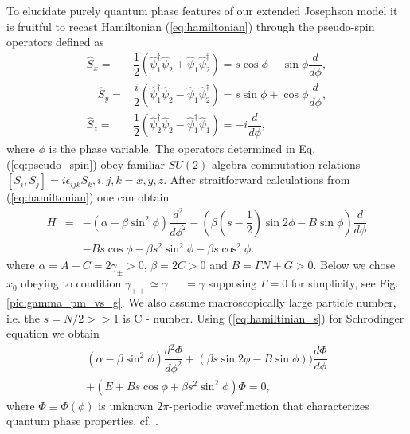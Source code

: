 \documentclass[aps, pre, preprint, groupedaddress, superscriptaddress, showkeys, showpacs] {revtex4-1}
\begin{document}
To elucidate purely quantum phase features of our extended Josephson model it is fruitful to recast Hamiltonian (\ref{eq:hamiltonian}) through the pseudo-spin operators defined as
% 
\begin{subequations}
\begin{align}
\hat{S}_x = & \dfrac{1}{2} (\hat{\psi}_1^\dag \hat{\psi}_2 + \hat{\psi}_1 \hat{\psi}_2^\dag) = s \cos{\phi} - \sin{\phi} \dfrac{d}{d \phi}, \\
\quad \hat{S}_y = & \dfrac{i}{2} (\hat{\psi}_1^\dag \hat{\psi}_2 - \hat{\psi}_1 \hat{\psi}_2^\dag) = s \sin{\phi} + \cos{\phi} \dfrac{d}{d \phi}, \\
\hat{S}_z = & \dfrac{1}{2} (\hat{\psi}_2^\dag \hat{\psi}_2 - \hat{\psi}_1^\dag \hat{\psi}_1) = -i\dfrac{d}{d \phi},
\end{align}
\label{eq:pseudo_spin}
\end{subequations}
where  $\phi$ is the phase variable.
The operators determined in Eq. (\ref{eq:pseudo_spin}) obey familiar $SU(2)$ algebra commutation relations $[S_i, S_j] = i\epsilon_{ijk}S_k,  i,j,k=x,y,z$.
After straitforward calculations from (\ref{eq:hamiltonian}) one can obtain
%
\begin{equation}
\begin{array}{lcl}
H & = & -(\alpha - \beta \sin^2 \phi) \dfrac{d^2}{d \phi^2} - (\beta(s-\dfrac{1}{2})\sin{2\phi} - B\sin{\phi}) \dfrac{d}{d \phi} \\
&& - Bs \cos \phi - \beta s^2 \sin^2 \phi - \beta s \cos^2 \phi.
\end{array}
\label{eq:hamiltinian_s}
\end{equation}
%
where $\alpha = A - C = 2\gamma_{\pm} > 0$, $\beta = 2C > 0$ and $B = \Gamma N + G > 0$.
Below we chose $x_0$ obeying to condition $\gamma_{++} \simeq \gamma_{--} = \gamma$ supposing $\Gamma = 0$ for simplicity, see Fig. \ref{pic:gamma_pm_vs_g}. We also assume macroscopically large particle number, i.e. the $s = N/2 >> 1$ is C - number. Using (\ref{eq:hamiltinian_s})  for Schrodinger equation we obtain   
%
\begin{equation}
\begin{array}{l}
(\alpha - \beta \sin^2 \phi) \dfrac{d^2 \Phi}{d \phi^2} + (\beta s\sin{2\phi}-B\sin{\phi})) \dfrac{d \Phi}{d \phi} \\
+ (E + B s \cos \phi + \beta s^2 \sin^2 \phi) \Phi = 0,
\end{array}
\label{eq:schrodinger}
\end{equation}
%
where $\Phi \equiv \Phi(\phi)$ is unknown $2\pi$-periodic wavefunction that characterizes quantum phase properties, cf. \cite{Anglin}.
\end{document}
